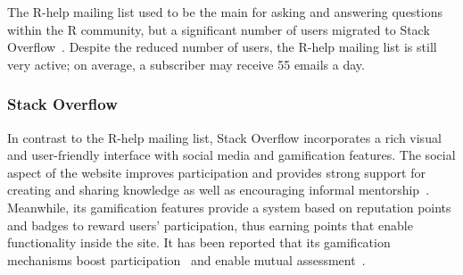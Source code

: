     The R-help mailing list used to be the main \channel for asking and answering questions within the R community, but a significant number of users migrated to Stack Overflow~\cite{Vasilescu2014c}.
    Despite the reduced number of users, the R-help mailing list is still very active; on average, a subscriber may receive 55 emails a day.

\subsubsection{Stack Overflow}
\label{subsec:Rtag}

    In contrast to the R-help mailing list, Stack Overflow incorporates a rich visual and user-friendly interface with social media and gamification features.
    The social aspect of the website improves participation and provides strong support for creating and sharing knowledge as well as encouraging informal mentorship~\cite{Jenkins2009, Storey2014}.
    Meanwhile, its gamification features provide a system based on reputation points and badges to reward users' participation, thus earning points that enable functionality inside the site.
    It has been reported that its gamification mechanisms boost participation~\cite{Vasilescu2014} and enable mutual assessment~\cite{Singer2013}.


